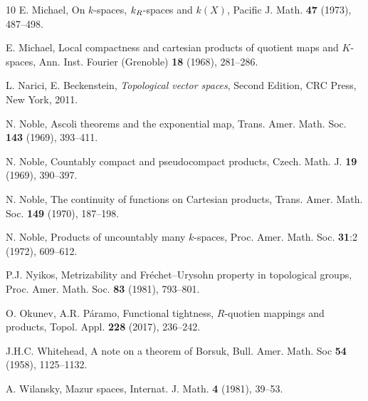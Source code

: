 \documentclass[preprint,11pt]{elsarticle}
\numberwithin{equation}{section}
\numberwithin{theorem}{section}
\begin{document}
\begin{thebibliography}{10}
E. Michael, On $k$-spaces, $k\sb{R}$-spaces and $k(X)$, Pacific J. Math. \textbf{47}  (1973), 487--498.

E. Michael, Local compactness and cartesian products of quotient maps and $K$-spaces, Ann. Inst. Fourier (Grenoble) \textbf{18} (1968), 281--286.

L. Narici, E. Beckenstein,  \emph{Topological vector spaces}, Second Edition, CRC Press, New York, 2011.

N. Noble, Ascoli theorems and the exponential map, Trans. Amer. Math. Soc. \textbf{143}  (1969), 393--411.

N. Noble, Countably compact and pseudocompact products, Czech. Math. J. \textbf{19} (1969), 390--397.

N. Noble,  The continuity of functions on Cartesian products, Trans. Amer. Math. Soc. \textbf{149}  (1970), 187--198.

N. Noble, Products of uncountably many $k$-spaces, Proc.  Amer. Math. Soc. \textbf{31}:2 (1972), 609--612.



P.J. Nyikos,  Metrizability and Fr\'{e}chet--Urysohn property in topological groups,  Proc. Amer. Math. Soc. \textbf{83}  (1981), 793--801.

O. Okunev, A.R. P\'{a}ramo, Functional tightness, $R$-quotien mappings and products, Topol. Appl. \textbf{228} (2017), 236--242.


J.H.C. Whitehead, A note on a theorem of Borsuk, Bull. Amer. Math. Soc \textbf{54} (1958), 1125--1132.

A. Wilansky, Mazur spaces, Internat. J. Math. \textbf{4} (1981), 39--53.


\end{thebibliography}
\end{document}
